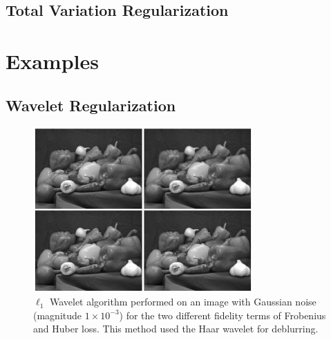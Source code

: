 \documentclass[10pt,a4paper]{article}
\begin{document}
\subsection{Total Variation Regularization}

\section{Examples}

\subsection{Wavelet Regularization}


\begin{figure}[H]
\begin{center}
\includegraphics[width = 0.75\textwidth]{../figures/waveletGaussH.pdf} 
\end{center}
\caption{$\ell_1$ Wavelet algorithm performed on an image with Gaussian noise (magnitude $1 \times 10^{-3}$) for the two different fidelity terms of Frobenius and Huber loss. This method used the Haar wavelet for deblurring.}
\label{waveletH_gauss}
\end{figure}
\end{document}
